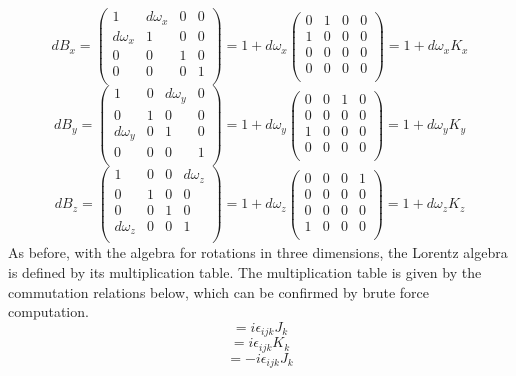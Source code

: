 \documentclass[12pt]{article}
\begin{document}
\begin{equation}
dB_x = 
\begin{pmatrix}
1 & d\omega_x & 0 & 0 \\
d\omega_x & 1 & 0 & 0 \\
0 & 0 & 1 & 0 \\
0 & 0 & 0 & 1 \\
\end{pmatrix}
= 1 + d\omega_x 
\begin{pmatrix}
0 & 1 & 0 & 0 \\
1 & 0 & 0 & 0 \\
0 & 0 & 0 & 0 \\
0 & 0 & 0 & 0 \\
\end{pmatrix}
= 1 + d\omega_x K_x
\end{equation}
\begin{equation}
dB_y = 
\begin{pmatrix}
1 & 0 & d\omega_y & 0 \\
0 & 1 & 0 & 0 \\
d\omega_y & 0 & 1 & 0 \\
0 & 0 & 0 & 1 \\
\end{pmatrix}
= 1 + d\omega_y
\begin{pmatrix}
0 & 0 & 1 & 0 \\
0 & 0 & 0 & 0 \\
1 & 0 & 0 & 0 \\
0 & 0 & 0 & 0 \\
\end{pmatrix}
= 1 + d\omega_y K_y
\end{equation}
\begin{equation}
dB_z = 
\begin{pmatrix}
1 & 0 & 0 & d\omega_z \\
0 & 1 & 0 & 0 \\
0 & 0 & 1 & 0 \\
d\omega_z & 0 & 0 & 1 \\
\end{pmatrix}
= 1 + d\omega_z
\begin{pmatrix}
0 & 0 & 0 & 1 \\
0 & 0 & 0 & 0 \\
0 & 0 & 0 & 0 \\
1 & 0 & 0 & 0 \\
\end{pmatrix}
= 1 + d\omega_z K_z
\end{equation}
As before, with the algebra for rotations in three dimensions, the Lorentz algebra is defined by its multiplication table. The multiplication table is given by the commutation relations below, which can be confirmed by brute force computation.  
\begin{equation}
[J_i, J_j] = i\epsilon_{ijk}J_k
\end{equation}
\begin{equation}
[J_i, K_j] = i\epsilon_{ijk}K_k
\end{equation}
\begin{equation}
[K_i, K_j] = -i\epsilon_{ijk}J_k
\end{equation}
\end{document}
